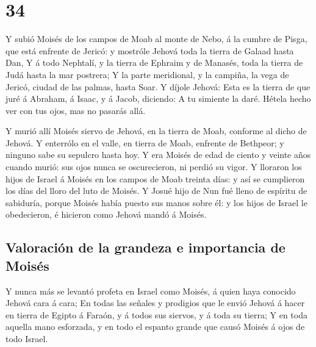 \hypertarget{section-05-34}{%
\section{34}\label{section-05-34}}

 Y subió Moisés de los campos de Moab al monte de Nebo, á
la cumbre de Pisga, que está enfrente de Jericó: y mostróle Jehová toda
la tierra de Galaad hasta Dan,  Y á todo Nephtalí, y la
tierra de Ephraim y de Manasés, toda la tierra de Judá hasta la mar
postrera;  Y la parte meridional, y la campiña, la vega de
Jericó, ciudad de las palmas, hasta Soar.  Y díjole
Jehová: Esta es la tierra de que juré á Abraham, á Isaac, y á Jacob,
diciendo: A tu simiente la daré. Hétela hecho ver con tus ojos, mas no
pasarás allá.

 Y murió allí Moisés siervo de Jehová, en la tierra de
Moab, conforme al dicho de Jehová.  Y enterrólo en el
valle, en tierra de Moab, enfrente de Bethpeor; y ninguno sabe su
sepulcro hasta hoy.  Y era Moisés de edad de ciento y
veinte años cuando murió: sus ojos nunca se oscurecieron, ni perdió su
vigor.  Y lloraron los hijos de Israel á Moisés en los
campos de Moab treinta días: y así se cumplieron los días del lloro del
luto de Moisés.  Y Josué hijo de Nun fué lleno de espíritu
de sabiduría, porque Moisés había puesto sus manos sobre él: y los hijos
de Israel le obedecieron, é hicieron como Jehová mandó á Moisés.

\hypertarget{valoraciuxf3n-de-la-grandeza-e-importancia-de-moisuxe9s}{%
\subsection{Valoración de la grandeza e importancia de
Moisés}\label{valoraciuxf3n-de-la-grandeza-e-importancia-de-moisuxe9s}}

 Y nunca más se levantó profeta en Israel como Moisés, á
quien haya conocido Jehová cara á cara;  En todas las
señales y prodigios que le envió Jehová á hacer en tierra de Egipto á
Faraón, y á todos sus siervos, y á toda su tierra;  Y en
toda aquella mano esforzada, y en todo el espanto grande que causó
Moisés á ojos de todo Israel.
